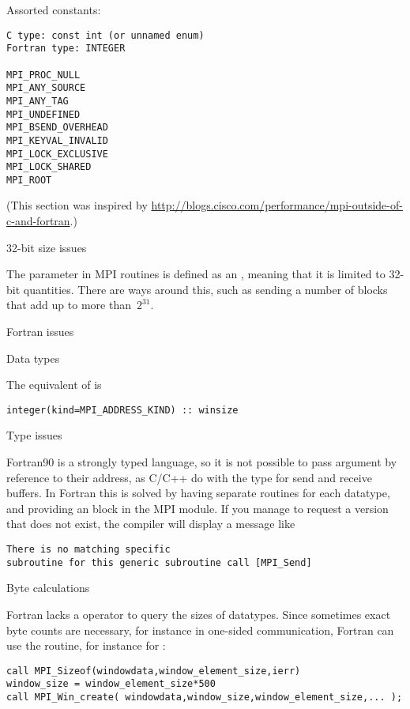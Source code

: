 Assorted constants:
\begin{lstlisting}
C type: const int (or unnamed enum)
Fortran type: INTEGER

MPI_PROC_NULL
MPI_ANY_SOURCE
MPI_ANY_TAG
MPI_UNDEFINED
MPI_BSEND_OVERHEAD
MPI_KEYVAL_INVALID                
MPI_LOCK_EXCLUSIVE
MPI_LOCK_SHARED
MPI_ROOT
\end{lstlisting}

(This section was inspired by
\url{http://blogs.cisco.com/performance/mpi-outside-of-c-and-fortran}.)


 {32-bit size issues}

The  parameter in MPI routines is defined as an ,
meaning that it is limited to 32-bit quantities.  There are ways
around this, such as sending a number of
 blocks that add up to more than~$2^{31}$.

 {Fortran issues}
\label{sec:ref:mpi-fortran}

 {Data types}

The equivalent of  is
\lstset{language=Fortran}
\begin{lstlisting}
integer(kind=MPI_ADDRESS_KIND) :: winsize
\end{lstlisting}

 {Type issues}

Fortran90 is a strongly typed language, so it is not possible to pass
argument by reference to their address, as C/C++ do with the 
type for send and receive buffers. In Fortran this is solved by having
separate routines for each datatype, and providing an  block
in the MPI module. If you manage to request a version that does not exist,
the compiler will display a message like
\begin{verbatim}
There is no matching specific 
subroutine for this generic subroutine call [MPI_Send]
\end{verbatim}

 {Byte calculations}
\label{sec:f-sizeof}

Fortran lacks a  operator to query the sizes of datatypes.
Since sometimes exact byte counts are necessary,
for instance in one-sided communication,
Fortran can use the  routine,
for instance for :
\begin{lstlisting}
call MPI_Sizeof(windowdata,window_element_size,ierr)
window_size = window_element_size*500
call MPI_Win_create( windowdata,window_size,window_element_size,... );
\end{lstlisting}
\lstset{language=C}

